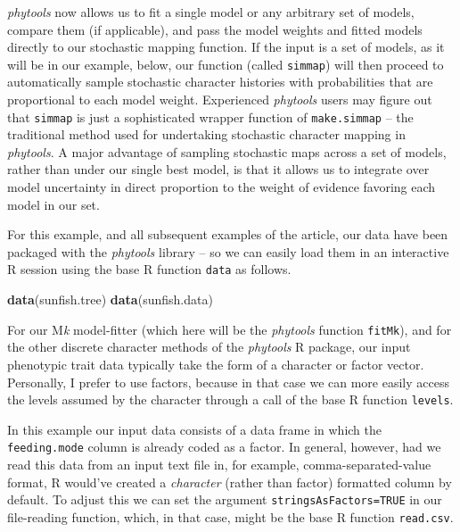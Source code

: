 \documentclass[fleqn,10pt,lineno]{wlpeerj} %
\newenvironment{Shaded}{\begin{snugshade}}{\end{snugshade}}
\newcommand{\FunctionTok}[1]{\textcolor[rgb]{0.13,0.29,0.53}{\textbf{#1}}}
\newcommand{\NormalTok}[1]{#1}
\begin{document}
\emph{phytools} now allows us to fit a single model or any arbitrary set of models, compare them (if applicable), and pass the model weights and fitted models directly to our stochastic mapping function. If the input is a set of models, as it will be in our example, below, our function (called \texttt{simmap}) will then proceed to automatically sample stochastic character histories with probabilities that are proportional to each model weight. Experienced \emph{phytools} users may figure out that \texttt{simmap} is just a sophisticated wrapper function of \texttt{make.simmap} -- the traditional method used for undertaking stochastic character mapping in \emph{phytools}. A major advantage of sampling stochastic maps across a set of models, rather than under our single best model, is that it allows us to integrate over model uncertainty in direct proportion to the weight of evidence favoring each model in our set.

For this example, and all subsequent examples of the article, our data have been packaged with the \emph{phytools} library -- so we can easily load them in an interactive R session using the base R function \texttt{data} as follows.

\begin{Shaded}
\begin{Highlighting}[]
\FunctionTok{data}\NormalTok{(sunfish.tree)}
\FunctionTok{data}\NormalTok{(sunfish.data)}
\end{Highlighting}
\end{Shaded}

For our M\emph{k} model-fitter (which here will be the \emph{phytools} function \texttt{fitMk}), and for the other discrete character methods of the \emph{phytools} R package, our input phenotypic trait data typically take the form of a character or factor vector. Personally, I prefer to use factors, because in that case we can more easily access the levels assumed by the character through a call of the base R function \texttt{levels}.

In this example our input data consists of a data frame in which the \texttt{feeding.mode} column is already coded as a factor. In general, however, had we read this data from an input text file in, for example, comma-separated-value format, R would've created a \emph{character} (rather than factor) formatted column by default. To adjust this we can set the argument \texttt{stringsAsFactors=TRUE} in our file-reading function, which, in that case, might be the base R function \texttt{read.csv}.
\end{document}
